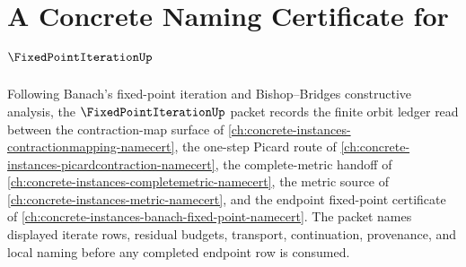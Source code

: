 \chapter{A Concrete Naming Certificate for $\FixedPointIterationUp$}
\label{ch:concrete-instances-fixed-point-iteration-namecert}

Following Banach's fixed-point iteration and Bishop--Bridges constructive analysis, the $\FixedPointIterationUp$ packet records the finite orbit ledger read between the contraction-map surface of \autoref{ch:concrete-instances-contractionmapping-namecert}, the one-step Picard route of \autoref{ch:concrete-instances-picardcontraction-namecert}, the complete-metric handoff of \autoref{ch:concrete-instances-completemetric-namecert}, the metric source of \autoref{ch:concrete-instances-metric-namecert}, and the endpoint fixed-point certificate of \autoref{ch:concrete-instances-banach-fixed-point-namecert}. The packet names displayed iterate rows, residual budgets, transport, continuation, provenance, and local naming before any completed endpoint row is consumed.

